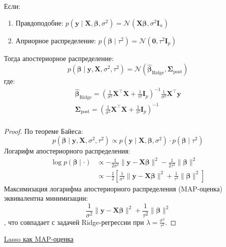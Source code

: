 \begin{theorem}
    Если:
    \begin{enumerate}
        \item Правдоподобие: $p(\bm{y} \mid \bm{X}, \bm{\beta}, \sigma^2) = \mathcal{N}(\bm{X}\bm{\beta}, \sigma^2 \bm{I}_n)$
        \item Априорное распределение: $p(\bm{\beta} \mid \tau^2) = \mathcal{N}(\bm{0}, \tau^2 \bm{I}_p)$
    \end{enumerate}
    Тогда апостериорное распределение:
    \[ p(\bm{\beta} \mid \bm{y}, \bm{X}, \sigma^2, \tau^2) = \mathcal{N}(\hat{\bm{\beta}}_{\text{Ridge}},
    \bm{\Sigma}_{\text{post}}) \]
    где:
    \begin{gather*}
        \hat{\bm{\beta}}_{\text{Ridge}} = \left(\frac{1}{\sigma^2}\bm{X}^\top\bm{X} +
                                             \frac{1}{\tau^2}\bm{I}_p\right)^{-1} \frac{1}{\sigma^2}\bm{X}^\top\bm{y}\\
        \bm{\Sigma}_{\text{post}} = \left(\frac{1}{\sigma^2}\bm{X}^\top\bm{X} + \frac{1}{\tau^2}\bm{I}_p\right)^{-1}\\
    \end{gather*}
\end{theorem}

\begin{proof}
    По теореме Байеса:
    \[ p(\bm{\beta} \mid \bm{y}, \bm{X}, \sigma^2, \tau^2) \propto p(\bm{y} \mid \bm{X}, \bm{\beta}, \sigma^2) \cdot
    p(\bm{\beta} \mid \tau^2)\]
    Логарифм апостериорного распределения:
    \begin{align*}
        \log p(\bm{\beta} \mid \cdot) &\propto -\frac{1}{2\sigma^2}\|\bm{y} - \bm{X}\bm{\beta}\|^2 -
        \frac{1}{2\tau^2}\|\bm{\beta}\|^2 \\
        &\propto -\frac{1}{2}\left[\frac{1}{\sigma^2}\|\bm{y} - \bm{X}\bm{\beta}\|^2 + \frac{1}{\tau^2}\|\bm{\beta}\|^2\right]
    \end{align*}
    Максимизация логарифма апостериорного распределения (MAP-оценка) эквивалентна минимизации:
    \[ \frac{1}{\sigma^2}\|\bm{y} - \bm{X}\bm{\beta}\|^2 + \frac{1}{\tau^2}\|\bm{\beta}\|^2 \],
    что совпадает с задачей Ridge-регрессии при $\lambda = \frac{\sigma^2}{\tau^2}$.
\end{proof}

\underline{Lasso как MAP-оценка}

